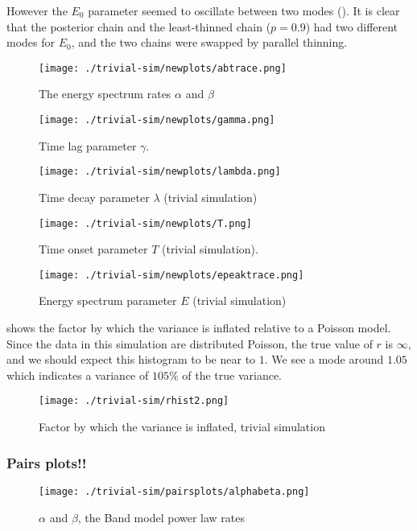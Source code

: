 \documentclass[12pt,letterpaper]{article}
\begin{document}
However the $E_0$ parameter seemed to oscillate between two modes (). It is clear that the posterior chain and the least-thinned chain ($p=0.9$) had two different modes for $E_0$, and the two chains were swapped by parallel thinning.
\begin{figure}
 \centering
\texttt{[image: ./trivial-sim/newplots/abtrace.png]}
\caption{The energy spectrum rates $\alpha$ and $\beta$}
\label{f:triv-ab}
\end{figure}


\begin{figure}
 \centering
\texttt{[image: ./trivial-sim/newplots/gamma.png]}
\caption{Time lag parameter $\gamma$.}
\label{f:triv-gamma}
\end{figure}


\begin{figure}
 \centering
\texttt{[image: ./trivial-sim/newplots/lambda.png]}
\caption{Time decay parameter $\lambda$ (trivial simulation)}
\label{f:triv-lambda}
\end{figure}


\begin{figure}
 \centering
\texttt{[image: ./trivial-sim/newplots/T.png]}
\caption{Time onset parameter $T$ (trivial simulation).}
 \label{f:triv-T}
\end{figure}

\begin{figure}
 \centering
\texttt{[image: ./trivial-sim/newplots/epeaktrace.png]}
\caption{Energy spectrum parameter $E$ (trivial simulation)}
 \label{f:triv-E}
\end{figure}

 shows the factor by which the variance is inflated relative to a Poisson model.  Since the data in this simulation are distributed Poisson, the true value of $r$ is $\infty$, and we should expect this histogram to be near to $1$. We see a mode around $1.05$ which indicates a variance of $105\%$ of the true variance.

\begin{figure}
 \centering
\texttt{[image: ./trivial-sim/rhist2.png]}
\caption{Factor by which the variance is inflated, trivial simulation}
 \label{f:triv-r}
\end{figure}

\subsubsection{Pairs plots!!}
\begin{figure}
 \centering
\texttt{[image: ./trivial-sim/pairsplots/alphabeta.png]}
\caption{$\alpha$ and $\beta$, the Band model power law rates}
\end{figure}
\end{document}
